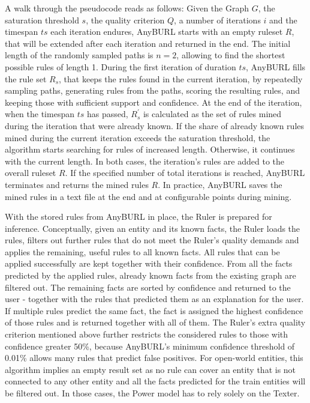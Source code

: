 A walk through the pseudocode reads as follows: Given the Graph $G$, the saturation threshold $s$, the quality criterion $Q$, a number of iterations $i$ and the timespan $ts$ each iteration endures, AnyBURL starts with an empty ruleset $R$, that will be extended after each iteration and returned in the end. The initial length of the randomly sampled paths is $n=2$, allowing to find the shortest possible rules of length 1. During the first iteration of duration $ts$, AnyBURL fills the rule set $R_s$, that keeps the rules found in the current iteration, by repeatedly sampling paths, generating rules from the paths, scoring the resulting rules, and keeping those with sufficient support and confidence. At the end of the iteration, when the timespan $ts$ has passed, $R_s^{'}$ is calculated as the set of rules mined during the iteration that were already known. If the share of already known rules mined during the current iteration exceeds the saturation threshold, the algorithm starts searching for rules of increased length. Otherwise, it continues with the current length. In both cases, the iteration's rules are added to the overall ruleset $R$. If the specified number of total iterations is reached, AnyBURL terminates and returns the mined rules $R$. In practice, AnyBURL saves the mined rules in a text file at the end and at configurable points during mining.

With the stored rules from AnyBURL in place, the Ruler is prepared for inference. Conceptually, given an entity and its known facts, the Ruler loads the rules, filters out further rules that do not meet the Ruler's quality demands and applies the remaining, useful rules to all known facts. All rules that can be applied successfully are kept together with their confidence. From all the facts predicted by the applied rules, already known facts from the existing graph are filtered out. The remaining facts are sorted by confidence and returned to the user - together with the rules that predicted them as an explanation for the user. If multiple rules predict the same fact, the fact is assigned the highest confidence of those rules and is returned together with all of them. The Ruler's extra quality criterion mentioned above further restricts the considered rules to those with confidence greater 50\%, because AnyBURL's minimum confidence threshold of 0.01\% allows many rules that predict false positives. For open-world entities, this algorithm implies an empty result set as no rule can cover an entity that is not connected to any other entity and all the facts predicted for the train entities will be filtered out. In those cases, the Power model has to rely solely on the Texter.

